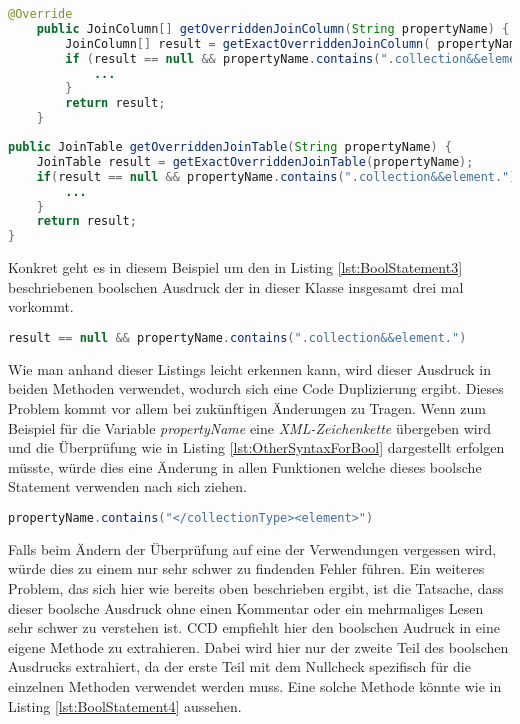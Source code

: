 \begin{lstlisting}[language=Java, caption=Komplexe boolsche Ausdrücke 1 Zeile 255 - 264, label=lst:BoolStatement1]
	@Override
	public JoinColumn[] getOverriddenJoinColumn(String propertyName) {
		JoinColumn[] result = getExactOverriddenJoinColumn( propertyName );
		if (result == null && propertyName.contains(".collection&&element.")) {
			...
		}
		return result;
	}
\end{lstlisting}

\begin{lstlisting}[language=Java, caption=Komplexe boolsche Ausdrücke 2 Zeile 305 - 313, label=lst:BoolStatement2]
public JoinTable getOverriddenJoinTable(String propertyName) {
	JoinTable result = getExactOverriddenJoinTable(propertyName);
	if(result == null && propertyName.contains(".collection&&element.")){
		...
	}
	return result;
}
\end{lstlisting}

\SuperPar Konkret geht es in diesem Beispiel um den in Listing \ref{lst:BoolStatement3} beschriebenen boolschen Ausdruck der in dieser Klasse insgesamt drei mal vorkommt.

\begin{lstlisting}[language=Java, caption=Boolscher Audruck, label=lst:BoolStatement3]
result == null && propertyName.contains(".collection&&element.")
\end{lstlisting}

\SuperPar Wie man anhand dieser Listings leicht erkennen kann, wird dieser Ausdruck in beiden Methoden verwendet, wodurch sich eine Code Duplizierung ergibt. Dieses Problem kommt vor allem bei zukünftigen Änderungen zu Tragen. Wenn zum Beispiel für die Variable \textit{propertyName} eine \textit{XML-Zeichenkette} übergeben wird und die Überprüfung wie in Listing \ref{lst:OtherSyntaxForBool} dargestellt erfolgen müsste, würde dies eine Änderung in allen Funktionen welche dieses boolsche Statement verwenden nach sich ziehen. 

\begin{lstlisting}[language=Java, caption=Boolscher Ausdruck neu, label=lst:OtherSyntaxForBool]
 propertyName.contains("</collectionType><element>")
\end{lstlisting}

\SuperPar Falls beim Ändern der Überprüfung auf eine der Verwendungen vergessen wird, würde dies zu einem nur sehr schwer zu findenden Fehler führen. Ein weiteres Problem, das sich hier wie bereits oben beschrieben ergibt, ist die Tatsache, dass dieser boolsche Ausdruck ohne einen Kommentar oder ein mehrmaliges Lesen sehr schwer zu verstehen ist. CCD empfiehlt hier den boolschen Audruck in eine eigene Methode zu extrahieren. Dabei wird hier nur der zweite Teil des boolschen Ausdrucks extrahiert, da der erste Teil mit dem Nullcheck spezifisch für die einzelnen Methoden verwendet werden muss. Eine solche Methode könnte wie in Listing \ref{lst:BoolStatement4} aussehen.

